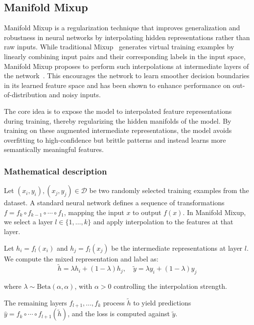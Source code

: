 \subsection{Manifold Mixup}
Manifold Mixup is a regularization technique that improves generalization and robustness in neural networks by interpolating hidden representations rather than raw inputs. While traditional Mixup~\cite{Mixup} generates virtual training examples by linearly combining input pairs and their corresponding labels in the input space, Manifold Mixup proposes to perform such interpolations at intermediate layers of the network~\cite{manifoldmixup}. This encourages the network to learn smoother decision boundaries in its learned feature space and has been shown to enhance performance on out-of-distribution and noisy inputs.

The core idea is to expose the model to interpolated feature representations during training, thereby regularizing the hidden manifolds of the model. By training on these augmented intermediate representations, the model avoids overfitting to high-confidence but brittle patterns and instead learns more semantically meaningful features.

\subsubsection{Mathematical description}
Let \((x_i, y_i), (x_j, y_j) \in \mathcal{D}\) be two randomly selected training examples from the dataset. A standard neural network defines a sequence of transformations \( f = f_k \circ f_{k-1} \circ \cdots \circ f_1 \), mapping the input \( x \) to output \( f(x) \). In Manifold Mixup, we select a layer \( l \in \{1, \ldots, k\} \) and apply interpolation to the features at that layer.

Let \( h_i = f_l(x_i) \) and \( h_j = f_l(x_j) \) be the intermediate representations at layer \( l \). We compute the mixed representation and label as:
\begin{equation}
\tilde{h} = \lambda h_i + (1 - \lambda) h_j, \quad \tilde{y} = \lambda y_i + (1 - \lambda) y_j
\end{equation}


where \( \lambda \sim \text{Beta}(\alpha, \alpha) \), with \( \alpha > 0 \) controlling the interpolation strength.

The remaining layers \( f_{l+1}, \ldots, f_k \) process \( \tilde{h} \) to yield predictions \( \hat{y} = f_k \circ \cdots \circ f_{l+1}(\tilde{h}) \), and the loss is computed against \( \tilde{y} \).

